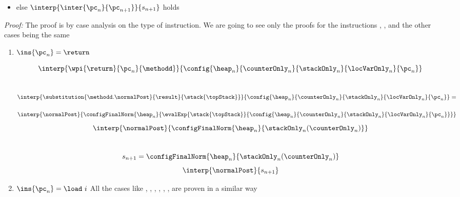 \begin{lemma}
\begin{itemize}
       \item  else $ \interp{\inter{\pc_n}{\pc_{n+1}}}{s_{n+1}}  $   holds 
  \end{itemize} 
\end{lemma}
\textit{Proof:}
The proof is by case analysis on the type of instruction. %
We are going to see only the proofs for the instructions \return , \load, \new{} and \putfield{} the other cases being the same
\begin{enumerate} 
		\item    $\ins{\pc_n} = \return$ 
		 
		     
			$$\interp{\wpi{\return}{\pc_{n}}{\methodd}} {\config{\heap_n }{\counterOnly_n }{\stackOnly_n }{\locVarOnly_n }{\pc_n }}  $$
			\mbox{\rm{} }
		        $$\interp {\substitution{ \methodd.\normalPost }{ \result }{\stack{\topStack} }}  { \config{\heap_n }{\counterOnly_n }{\stackOnly_n }{\locVarOnly_n }{\pc_n } } = $$
			\mbox{\rm{}}
			 
                          $$\interp { \normalPost} { \configFinalNorm{\heap_n  }
				                                   { \evalExp{ \stack{\topStack}}{\config{\heap_n }{\counterOnly_n }{\stackOnly_n }{\locVarOnly_n }{\pc_n } } }
                         }$$
			 $$  \interp{ \normalPost} { \configFinalNorm{\heap_n  }  
							    { \stackOnly_n ( \counterOnly_n  )  } } $$
			\\
		 	$$ s_{n+1} = \configFinalNorm{\heap_n  } { \stackOnly_n ( \counterOnly_n  )  }$$
			$$	\interp{ \normalPost} {s_{n+1} } $$ 
							    
		
	\item   $\ins{\pc_n } = \load \ i $ 
	          All the cases like \store, \arithOp, \iinc, \nop, \dup, \pop, \push {} are proven in a similar way
	                  

\end{enumerate}
